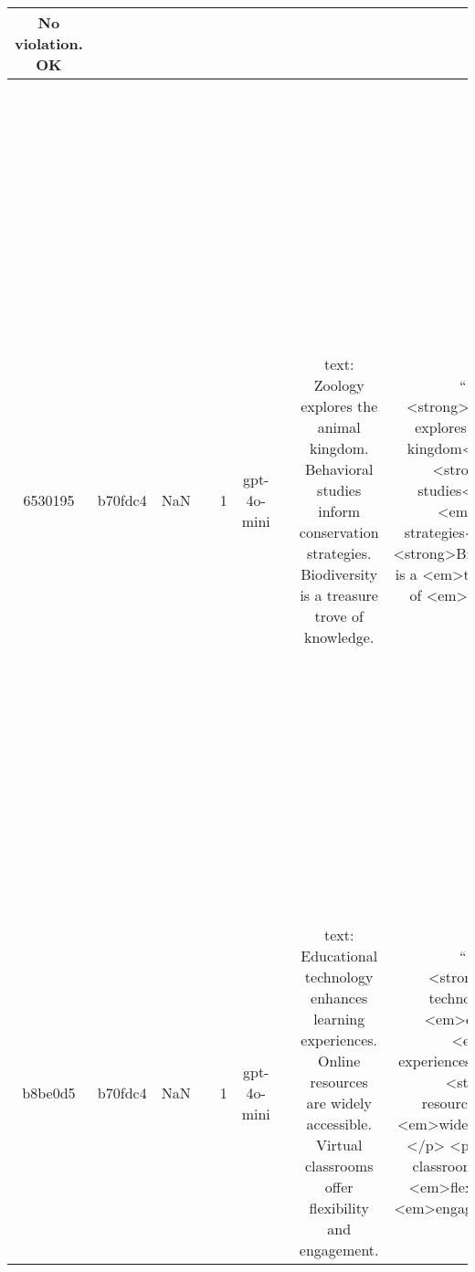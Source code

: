 \begin{table}[h!]
\begin{tabular}{|c|c|c|c|c|c|c|c|c|c|c|}
No violation.
OK\\
\hline
6530195 & b70fdc4 & NaN &  & 1 & gpt-4o-mini &  & text: Zoology explores the animal kingdom. Behavioral studies inform conservation strategies. Biodiversity is a treasure trove of knowledge. & ```html
<p><strong>Zoology</strong> explores the <em>animal kingdom</em>.</p>
<p><strong>Behavioral studies</strong> inform <em>conservation strategies</em>.</p>
<p><strong>Biodiversity</strong> is a <em>treasure trove</em> of <em>knowledge</em>.</p>
``` & ok & The chatbot's output contains three HTML paragraphs, each enclosed in `<p>` tags. Within these `<p>` tags:

1. Each paragraph contains one `<strong>` tag that emphasizes a word or phrase:
   - Paragraph 1: `<strong>Zoology</strong>`
   - Paragraph 2: `<strong>Behavioral studies</strong>`
   - Paragraph 3: `<strong>Biodiversity</strong>`

2. Each paragraph contains multiple `<em>` tags, highlighting key words or phrases:
   - Paragraph 1: `<em>animal kingdom</em>`
   - Paragraph 2: `<em>conservation strategies</em>`
   - Paragraph 3: `<em>treasure trove</em>`, `<em>knowledge</em>`

The chatbot's output meets the following criteria from the description:
- The output has at least three `<p>` tags.
- Inside each `<p>` tag, there is one `<strong>` tag.
- Inside each `<p>` tag, there are multiple `<em>` tags.

There are no violations based on the rules that can be checked without knowing the input. The output complies explicitly with the chatbot description as given.

No violation.
OK\\
\hline
b8be0d5 & b70fdc4 & NaN &  & 1 & gpt-4o-mini &  & text: Educational technology enhances learning experiences. Online resources are widely accessible. Virtual classrooms offer flexibility and engagement. & ```html
<p><strong>Educational technology</strong> <em>enhances</em> <em>learning experiences</em>.</p>
<p><strong>Online resources</strong> are <em>widely accessible</em>.</p>
<p><strong>Virtual classrooms</strong> offer <em>flexibility</em> and <em>engagement</em>.</p>
``` & ok & The chatbot output contains three sentences, each wrapped with a <p> tag, which satisfies the condition of having at least three <p> tags. Inside each <p> tag, there is at least one <strong> tag and multiple <em> tags emphasizing key words and phrases, as required. The output seems to correctly follow the format specified in the description provided.


\end{tabular}
\end{table}

